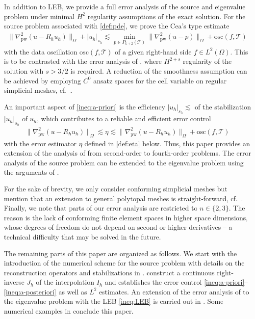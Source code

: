 \documentclass[a4paper]{amsart}
\numberwithin{equation}{section}
\def\T{\mathcal{T}}
\def\pw{\mathrm{pw}}
\theoremstyle{definition}
\theoremstyle{remark}
\numberwithin{theorem}{section}
\numberwithin{equation}{section}
\numberwithin{table}{section}
\numberwithin{figure}{section}
\begin{document}
In addition to LEB, we provide a full error analysis of the source and eigenvalue problem under minimal $H^2$ regularity assumptions of the exact solution.
For the source problem associated with \eqref{def:pde}, we prove the Cea's type estimate
\begin{align}\label{ineq:a-priori}
    \|\nabla^2_\pw(u - R_h u_h)\|_\Omega + |u_h|_{s_h} \lesssim \min_{p \in P_{k+2}(\mathcal{T})} \|\nabla^2_\pw(u - p)\|_\Omega + \mathrm{osc}(f,\mathcal{T})
\end{align}
with the data oscillation $\mathrm{osc}(f,\mathcal{T})$ of a given right-hand side $f \in L^2(\Omega)$.
This is to be contrasted with the error analysis of \cite{DongErn2022}, where $H^{2+s}$ regularity of the solution with $s > 3/2$ is required. A reduction of the smoothness assumption can be achieved by employing $C^0$ ansatz spaces for the cell variable on regular simplicial meshes, cf.~\cite{DongErn2024}.

An important aspect of \eqref{ineq:a-priori} is the efficiency $|u_h|_{s_h} \lesssim $ of the stabilization $|u_h|_{s_h}$ of $u_h$, which contributes to a reliable and efficient error control
\begin{align}\label{ineq:a-posteriori}
    \|\nabla^2_\pw(u - R_h u_h)\|_\Omega \lesssim \eta \lesssim \|\nabla^2_\pw(u - R_h u_h)\|_\Omega + \mathrm{osc}(f,\T)
\end{align}
with the error estimator $\eta$ defined in \eqref{def:eta} below. Thus, this paper provides an extension of the analysis of \cite{ErnZanotti2020,BertrandCarstensenGraessleTran2023,CarstensenTran2024} from second-order to fourth-order problems.
The error analysis of the source problem can be extended to the eigenvalue problem using the arguments of \cite{Gallistl2015,CarstensenGraessleTran2024}.

For the sake of brevity, we only consider conforming simplicial meshes but mention that an extension to general polytopal meshes is straight-forward, cf.~.
Finally, we note that parts of our error analysis are restricted to $n \in \{2,3\}$. The reason is the lack of conforming finite element spaces in higher space dimensions, whose degrees of freedom do not depend on second or higher derivatives -- a technical difficulty that may be solved in the future.

The remaining parts of this paper are organized as follows.
We start with the introduction of the numerical scheme for the source problem with details on the reconstruction operators and stabilizations in .
 construct a continuous right-inverse $J_h$ of the interpolation $I_h$ and establishes the error control \eqref{ineq:a-priori}--\eqref{ineq:a-posteriori} as well as $L^2$ estimates.
An extension of the error analysis of  to the eigenvalue problem with the LEB \eqref{ineq:LEB} is carried out in . Some numerical examples in  conclude this paper.
\end{document}
